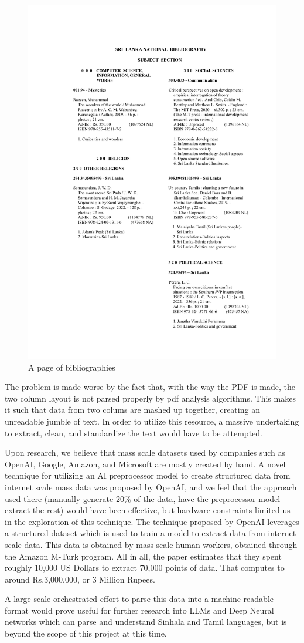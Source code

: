 \begin{figure}[htbp]
    \centering
    \includegraphics[width=1\textwidth]{../../assets/slnb_june_pg47.png}
    \caption{A page of bibliographies}
    \label{fig:slnbpage}
\end{figure}

The problem is made worse by the fact that, with the way the PDF is made, the two column layout is not parsed properly by pdf analysis algorithms. This makes it such that data from two colums are mashed up together, creating an unreadable jumble of text. In order to utilize this resource, a massive undertaking to extract, clean, and standardize the text would have to be attempted.

Upon research, we believe that mass scale datasets used by companies such as OpenAI, Google, Amazon, and Microsoft are mostly created by hand. A novel technique for utilizing an AI preprocessor model to create structured data from internet scale mass data was proposed by OpenAI, and we feel that the approach used there (manually generate 20\% of the data, have the preprocessor model extract the rest) would have been effective, but hardware constraints limited us in the exploration of this technique.
The technique proposed by OpenAI leverages a structured dataset which is used to train a model to extract data from internet-scale data. This data is obtained by mass scale human workers, obtained through the Amazon M-Turk program. All in all, the paper estimates that they spent roughly 10,000 US Dollars to extract 70,000 points of data. That computes to around Rs.3,000,000, or 3 Million Rupees.

A large scale orchestrated effort to parse this data into a machine readable format would prove useful for further research into LLMs and Deep Neural networks which can parse and understand Sinhala and Tamil languages, but is beyond the scope of this project at this time.

